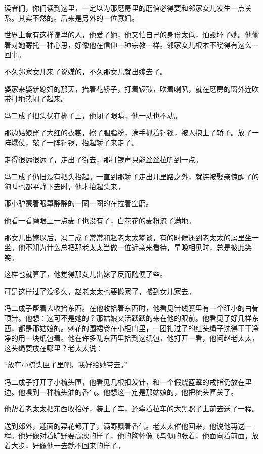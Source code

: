 \par 读者们，你们读到这里，一定以为那磨房里的磨倌必得要和邻家女儿发生一点关系。其实不然的。后来是另外的一位寡妇。
\par 世界上竟有这样谦卑的人，他爱了她，他又怕自己的身份太低，怕毁坏了她。他偷着对她寄托一种心思，好像他在信仰一种宗教一样。邻家女儿根本不晓得有这么一回事。
\par 不久邻家女儿来了说媒的，不久那女儿就出嫁去了。
\par 婆家来娶新媳妇的那天，抬着花轿子，打着锣鼓，吹着喇叭，就在磨房的窗外连吹带打地热闹了起来。
\par 冯二成子把头伏在梆子上，他闭了眼睛，他一动也不动。
\par 那边姑娘穿了大红的衣裳，擦了胭脂粉，满手抓着铜钱，被人抱上了轿子。放了一阵爆仗，敲了一阵铜锣，抬起轿子来走了。
\par 走得很远很远了，走出了街去，那打锣声只能丝丝拉听到一点。
\par 冯二成子仍旧没有把头抬起。一直到那轿子走出几里路之外，就连被娶亲惊醒了的狗叫也都平静下去时，他才抬起头来。
\par 那小驴蒙着眼罩静静的一圈一圈的在拉着空磨。
\par 他看一看磨眼上一点麦子也没有了，白花花的麦粉流了满地。
\par 那女儿出嫁以后，冯二成子常常和赵老太太攀谈，有的时候还到老太太的房里坐一坐。他不知为什么总把那老太太当做一位近亲来看待，早晚相见时，总是彼此笑笑。
\par 这样也就算了，他觉得那女儿出嫁了反而随便了些。
\par 可是这样过了没多久，赵老太太也要搬家了，搬到女儿家去。
\par 冯二成子帮着去收拾东西。在他收拾着东西时，他看见针线篓里有一个细小的白骨顶针。他想：这可不是她的？那姑娘又活跃跃的来在他的眼前。他看见了好几样东西，都是那姑娘的。刺花的围裙卷在小柜门里，一团扎过了的红头绳子洗得干干净净的用一块纸包着。他在许多乱东西里拾到这纸包，他打开一看，他问赵老太太，这头绳要放在哪里？老太太说：
\par “放在小梳头匣子里吧，我好给她带去。”
\par 冯二成子打开了小梳头匣，他看见几根扣发针，和一个假烧蓝翠的戒指仍放在里边。他嗅到一种梳头油的香气。他想这一定是那姑娘的，他把梳头匣关了。
\par 他帮着老太太把东西收拾好，装上了车，还牵着拉车的大黑骡子上前去送了一程。
\par 送到郊外，迎面的菜花都开了，满野飘着香气。老太太催他回来，他说他再送一程。他好像对着旷野要高歌的样子，他的胸怀像飞鸟似的张着，他面向着前面，放着大步，好像他一去就不回来的样子。
